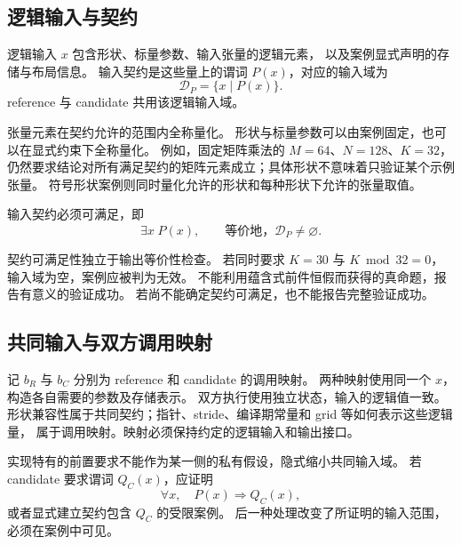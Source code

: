 \subsection{逻辑输入与契约}

\begin{definition}[逻辑输入与输入契约]
  逻辑输入 $x$ 包含形状、标量参数、输入张量的逻辑元素，
  以及案例显式声明的存储与布局信息。
  输入契约是这些量上的谓词 $P(x)$，对应的输入域为
  \begin{equation}
    \mathcal{D}_P = \{x \mid P(x)\}.
    \label{eq:opv-domain}
  \end{equation}
  reference 与 candidate 共用该逻辑输入域。
\end{definition}

张量元素在契约允许的范围内全称量化。
形状与标量参数可以由案例固定，也可以在显式约束下全称量化。
例如，固定矩阵乘法的 $M=64$、$N=128$、$K=32$，
仍然要求结论对所有满足契约的矩阵元素成立；具体形状不意味着只验证某个示例张量。
符号形状案例则同时量化允许的形状和每种形状下允许的张量取值。

\begin{definition}[案例有效性]
  输入契约必须可满足，即
  \begin{equation}
    \exists x\; P(x),
    \qquad\text{等价地，}\mathcal{D}_P\ne\varnothing.
    \label{eq:opv-satisfiable}
  \end{equation}
\end{definition}

契约可满足性独立于输出等价性检查。
若同时要求 $K=30$ 与 $K\bmod32=0$，输入域为空，案例应被判为无效。
不能利用蕴含式前件恒假而获得的真命题，报告有意义的验证成功。
若尚不能确定契约可满足，也不能报告完整验证成功。

\subsection{共同输入与双方调用映射}

记 $b_R$ 与 $b_C$ 分别为 reference 和 candidate 的调用映射。
两种映射使用同一个 $x$，构造各自需要的参数及存储表示。
双方执行使用独立状态，输入的逻辑值一致。
形状兼容性属于共同契约；指针、stride、编译期常量和 grid 等如何表示这些逻辑量，
属于调用映射。映射必须保持约定的逻辑输入和输出接口。

实现特有的前置要求不能作为某一侧的私有假设，隐式缩小共同输入域。
若 candidate 要求谓词 $Q_C(x)$，应证明
\begin{equation}
  \forall x,\quad P(x)\Longrightarrow Q_C(x),
  \label{eq:opv-requirement}
\end{equation}
或者显式建立契约包含 $Q_C$ 的受限案例。
后一种处理改变了所证明的输入范围，必须在案例中可见。

